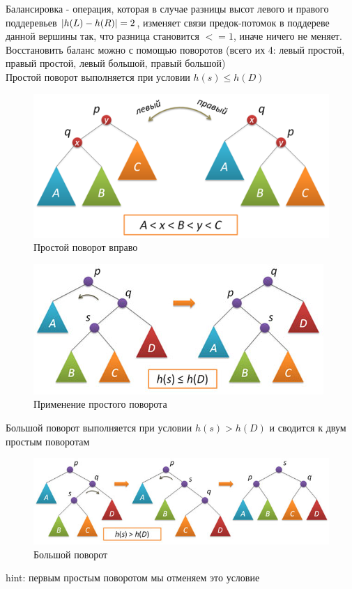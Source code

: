 \documentclass[discrete.tex]{subfiles}
\begin{document}
\begin{definition} [Балансировка]
    Балансировка - операция, которая в случае разницы высот левого и правого поддеревьев
    $\left|h(L) - h(R)\right| = 2$, изменяет связи предок-потомок
    в поддереве данной вершины так, что разница
    становится $<= 1$, иначе ничего не меняет.\\
    Восстановить баланс можно с помощью поворотов (всего их 4: левый простой,
    правый простой, левый большой, правый большой)\\
    Простой поворот выполняется при условии $h(s) \leq h(D)$
    \begin{figure}[H]
        \caption{Простой поворот вправо}
        \includegraphics[scale=0.5]{pics/33_1}
        \centering
    \end{figure}

    \begin{figure}[H]
        \caption{Применение простого поворота}
        \includegraphics[scale=0.5]{pics/33_2}
        \centering
    \end{figure}
    Большой поворот выполняется при условии $h(s) > h(D)$ и сводится к двум простым
    поворотам
    \begin{figure}[H]
        \caption{Большой поворот}
        \includegraphics[scale=0.5]{pics/33_3}
        \centering
    \end{figure}
    hint: первым простым поворотом мы отменяем это условие

\end{definition}
\end{document}

